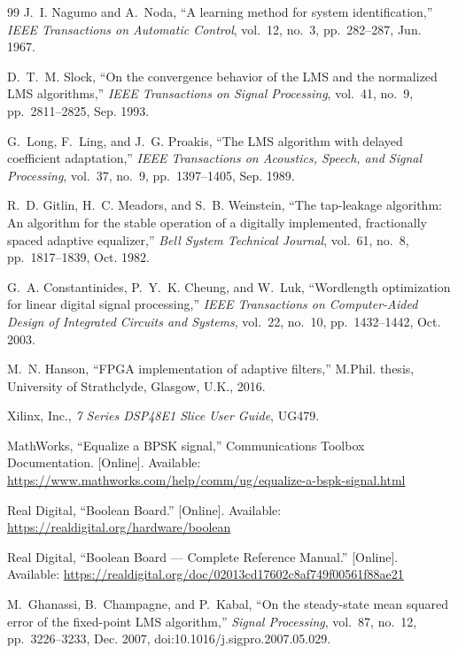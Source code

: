 {\begin{thebibliography}{99}
 J.~I. Nagumo and A.~Noda, ``A learning method for system identification,'' \emph{IEEE Transactions on Automatic Control}, vol.~12, no.~3, pp.~282--287, Jun. 1967.

 D.~T.~M. Slock, ``On the convergence behavior of the LMS and the normalized LMS algorithms,'' \emph{IEEE Transactions on Signal Processing}, vol.~41, no.~9, pp.~2811--2825, Sep. 1993.

 G.~Long, F.~Ling, and J.~G. Proakis, ``The LMS algorithm with delayed coefficient adaptation,'' \emph{IEEE Transactions on Acoustics, Speech, and Signal Processing}, vol.~37, no.~9, pp.~1397--1405, Sep. 1989.

 R.~D. Gitlin, H.~C. Meadors, and S.~B. Weinstein, ``The tap-leakage algorithm: An algorithm for the stable operation of a digitally implemented, fractionally spaced adaptive equalizer,'' \emph{Bell System Technical Journal}, vol.~61, no.~8, pp.~1817--1839, Oct. 1982.

 G.~A. Constantinides, P.~Y.~K. Cheung, and W.~Luk, ``Wordlength optimization for linear digital signal processing,'' \emph{IEEE Transactions on Computer-Aided Design of Integrated Circuits and Systems}, vol.~22, no.~10, pp.~1432--1442, Oct. 2003.

 M.~N. Hanson, ``FPGA implementation of adaptive filters,'' M.Phil. thesis, University of Strathclyde, Glasgow, U.K., 2016.

 Xilinx, Inc., \emph{7 Series DSP48E1 Slice User Guide}, UG479.

 MathWorks, ``Equalize a BPSK signal,'' Communications Toolbox Documentation. [Online]. Available: \url{https://www.mathworks.com/help/comm/ug/equalize-a-bspk-signal.html}

 Real Digital, ``Boolean Board.'' [Online]. Available: \url{https://realdigital.org/hardware/boolean}

 Real Digital, ``Boolean Board --- Complete Reference Manual.'' [Online]. Available: \url{https://realdigital.org/doc/02013cd17602c8af749f00561f88ae21}

\color{blue}

 M.~Ghanassi, B.~Champagne, and P.~Kabal, ``On the steady-state mean squared error of the fixed-point LMS algorithm,'' \emph{Signal Processing}, vol.~87, no.~12, pp.~3226--3233, Dec. 2007, doi:10.1016/j.sigpro.2007.05.029.


\end{thebibliography}}
